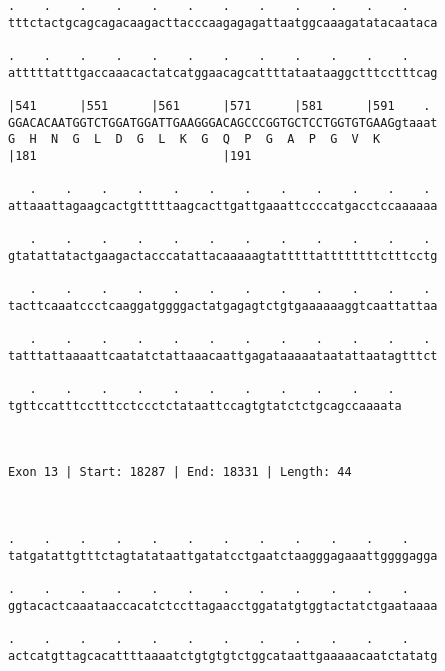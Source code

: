 \documentclass{article}
\begin{document}
\begin{Verbatim}
.    .    .    .    .    .    .    .    .    .    .    .    
tttctactgcagcagacaagacttacccaagagagattaatggcaaagatatacaataca
                                                            
.    .    .    .    .    .    .    .    .    .    .    .    
atttttatttgaccaaacactatcatggaacagcattttataataaggctttcctttcag
                                                            
|541      |551      |561      |571      |581      |591    . 
GGACACAATGGTCTGGATGGATTGAAGGGACAGCCCGGTGCTCCTGGTGTGAAGgtaaat
G  H  N  G  L  D  G  L  K  G  Q  P  G  A  P  G  V  K        
|181                          |191                          
  
   .    .    .    .    .    .    .    .    .    .    .    . 
attaaattagaagcactgtttttaagcacttgattgaaattccccatgacctccaaaaaa
                                                            
   .    .    .    .    .    .    .    .    .    .    .    . 
gtatattatactgaagactacccatattacaaaaagtatttttattttttttctttcctg
                                                            
   .    .    .    .    .    .    .    .    .    .    .    . 
tacttcaaatccctcaaggatggggactatgagagtctgtgaaaaaaggtcaattattaa
                                                            
   .    .    .    .    .    .    .    .    .    .    .    . 
tatttattaaaattcaatatctattaaacaattgagataaaaataatattaatagtttct
                                                            
   .    .    .    .    .    .    .    .    .    .    . 
tgttccatttcctttcctccctctataattccagtgtatctctgcagccaaaata
                                                       
                                                       
 
Exon 13 | Start: 18287 | End: 18331 | Length: 44



.    .    .    .    .    .    .    .    .    .    .    .    
tatgatattgtttctagtatataattgatatcctgaatctaagggagaaattggggagga
                                                            
.    .    .    .    .    .    .    .    .    .    .    .    
ggtacactcaaataaccacatctccttagaacctggatatgtggtactatctgaataaaa
                                                            
.    .    .    .    .    .    .    .    .    .    .    .    
actcatgttagcacattttaaaatctgtgtgtctggcataattgaaaaacaatctatatg
                                                            

\end{Verbatim}
\end{document}
